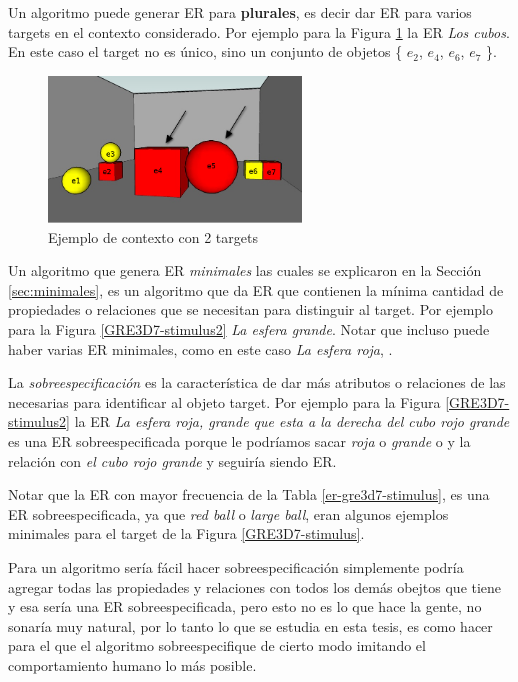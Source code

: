 Un algoritmo puede generar ER para {\bf plurales}, es decir dar ER para varios targets en el contexto considerado. Por ejemplo para la Figura \ref{plurales} la ER {\it Los cubos}. En este caso el target no es \'unico, sino un conjunto de objetos \{ $e_2$, $e_4$, $e_6$, $e_7$ \}. 

\begin{figure}[ht]
\centering
\includegraphics[width=0.6\textwidth]{images/22-plural.jpg}
\caption{Ejemplo de contexto con 2 targets}
\label{plurales}
\end{figure}

Un algoritmo que genera ER {\it minimales} las cuales se explicaron en la Secci\'on \ref{sec:minimales}, es un algoritmo que da ER que contienen la m\'inima cantidad de propiedades o relaciones que se necesitan para distinguir al target.  Por ejemplo para la Figura \ref{GRE3D7-stimulus2} {\it La esfera grande}. Notar que incluso puede haber varias ER minimales, como en este caso {\it La esfera roja}, .

La {\it sobreespecificaci\'on} es la caracter\'istica de dar m\'as atributos o relaciones de las necesarias para identificar al objeto target. Por ejemplo para la Figura \ref{GRE3D7-stimulus2} la ER {\it La esfera roja, grande que esta a la derecha del cubo rojo grande} es una ER sobreespecificada porque le podr\'iamos sacar {\it roja} o {\it grande} o y la relaci\'on con {\it el cubo rojo grande} y seguir\'ia siendo ER.

Notar que la ER con mayor frecuencia de la Tabla \ref{er-gre3d7-stimulus}, es una ER sobreespecificada, ya que {\it red ball} o {\it large ball}, eran algunos ejemplos minimales para el target de la Figura \ref{GRE3D7-stimulus}.

Para un algoritmo ser\'ia f\'acil hacer sobreespecificaci\'on simplemente podr\'ia agregar todas las propiedades y relaciones con todos los dem\'as obejtos que tiene y esa ser\'ia una ER sobreespecificada, pero esto no es lo que hace la gente, no sonar\'ia muy natural, por lo tanto lo que se estudia en esta tesis, es como hacer para el que el algoritmo sobreespecifique de cierto modo imitando el comportamiento humano lo m\'as posible.

